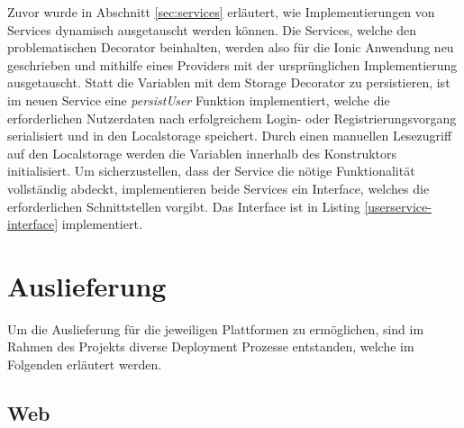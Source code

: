 Zuvor wurde in Abschnitt \ref{sec:services} erläutert, wie
Implementierungen von Services dynamisch ausgetauscht werden können.
Die Services, welche den problematischen Decorator beinhalten, werden also für die Ionic Anwendung neu geschrieben
und mithilfe eines Providers mit der ursprünglichen Implementierung ausgetauscht.
Statt die Variablen mit dem Storage Decorator zu persistieren, ist im neuen Service eine \emph{persistUser} Funktion implementiert, welche die erforderlichen Nutzerdaten nach
erfolgreichem Login- oder Registrierungsvorgang serialisiert und in den Localstorage speichert.
Durch einen manuellen Lesezugriff auf den Localstorage werden die Variablen innerhalb des Konstruktors initialisiert.
Um sicherzustellen, dass der Service die nötige Funktionalität vollständig abdeckt, implementieren beide Services ein Interface,
welches die erforderlichen Schnittstellen vorgibt. Das Interface ist in Listing \ref{userservice-interface} implementiert.

\vspace{0.3cm}





\newpage
\section{Auslieferung}

Um die Auslieferung für die jeweiligen Plattformen zu ermöglichen,
sind im Rahmen des Projekts \projectname{} diverse Deployment Prozesse entstanden,
welche im Folgenden erläutert werden.

\subsection{Web}
\label{deployment-web}

